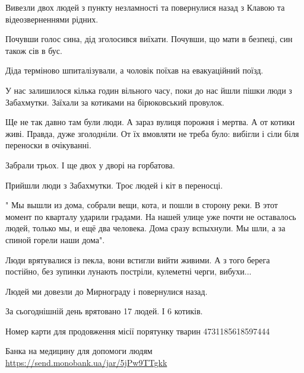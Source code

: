 Вивезли двох людей з пункту незламності та повернулися назад з Клавою та
відеозверненнями рідних.

Почувши голос сина, дід зголосився виїхати. Почувши, що мати в безпеці, син
також сів в бус.

Діда терміново шпиталізували, а чоловік поїхав на евакуаційний поїзд. 

У нас залишилося кілька годин вільного часу, поки до нас йшли пішки люди з
Забахмутки. Заїхали за котиками на бірюковський провулок.

Ще не так давно там були люди. А зараз вулиця порожня і мертва. А от котики
живі. Правда, дуже зголодніли. От їх вмовляти не треба було: вибігли і сіли
біля переноски в очікуванні. 

Забрали трьох. І ще двох у дворі на горбатова.

Прийшли люди з Забахмутки. Троє людей і кіт в переносці. 

" Мы вышли из дома, собрали вещи, кота, и пошли в сторону реки. В этот момент
по кварталу ударили градами. На нашей улице уже почти не оставалось людей,
только мы, и ещё два человека. Дома сразу вспыхнули. Мы шли, а за спиной горели
наши дома".

Люди врятувалися із пекла, вони встигли вийти живими. А з того берега постійно,
без зупинки лунають постріли, кулеметні черги, вибухи...

Людей ми довезли до Мирнограду і повернулися назад. 

За сьогоднішній день врятовано 17 людей. І 6 котиків. 

Номер карти для продовження місії порятунку тварин 4731185618597444

Банка на медицину для допомоги людям \url{https://send.monobank.ua/jar/5jPw9TTgkk}
